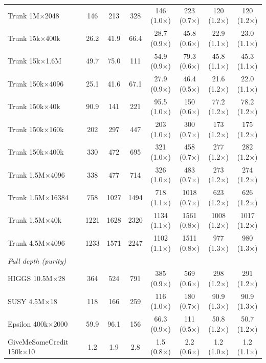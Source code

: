 \begin{table}[p]
\begin{tabular}{l|ccc|cccc}
        Trunk 1M$\times$2048 & 146 & 213 & 328 & 146 (1.0$\times$) & 223 (0.7$\times$) & 120 (1.2$\times$) & 120 (1.2$\times$) \\
        Trunk 15k$\times$400k & 26.2 & 41.9 & 66.4 & 28.7 (0.9$\times$) & 45.8 (0.6$\times$) & 22.9 (1.1$\times$) & 23.0 (1.1$\times$) \\
        Trunk 15k$\times$1.6M & 49.7 & 75.0 & 111 & 54.9 (0.9$\times$) & 79.3 (0.6$\times$) & 45.8 (1.1$\times$) & 45.3 (1.1$\times$) \\
        Trunk 150k$\times$4096 & 25.1 & 41.6 & 67.1 & 27.9 (0.9$\times$) & 46.4 (0.5$\times$) & 21.6 (1.2$\times$) & 22.0 (1.1$\times$) \\
        Trunk 150k$\times$40k & 90.9 & 141 & 221 & 95.5 (1.0$\times$) & 150 (0.6$\times$) & 77.2 (1.2$\times$) & 78.2 (1.2$\times$) \\
        Trunk 150k$\times$160k & 202 & 297 & 447 & 203 (1.0$\times$) & 300 (0.7$\times$) & 173 (1.2$\times$) & 175 (1.2$\times$) \\
        Trunk 150k$\times$400k & 330 & 472 & 695 & 321 (1.0$\times$) & 458 (0.7$\times$) & 277 (1.2$\times$) & 282 (1.2$\times$) \\
        Trunk 1.5M$\times$4096 & 338 & 477 & 714 & 326 (1.0$\times$) & 483 (0.7$\times$) & 273 (1.2$\times$) & 274 (1.2$\times$) \\
        Trunk 1.5M$\times$16384 & 758 & 1027 & 1494 & 718 (1.1$\times$) & 1018 (0.7$\times$) & 623 (1.2$\times$) & 626 (1.2$\times$) \\
        Trunk 1.5M$\times$40k & 1221 & 1628 & 2320 & 1134 (1.1$\times$) & 1561 (0.8$\times$) & 1008 (1.2$\times$) & 1017 (1.2$\times$) \\
        Trunk 4.5M$\times$4096 & 1233 & 1571 & 2247 & 1102 (1.1$\times$) & 1511 (0.8$\times$) & 977 (1.3$\times$) & 980 (1.3$\times$) \\
        \hline
        \multicolumn{8}{l}{\textit{Full depth (purity)}} \\
        HIGGS 10.5M$\times$28 & 364 & 524 & 791 & 385 (0.9$\times$) & 569 (0.6$\times$) & 298 (1.2$\times$) & 291 (1.2$\times$) \\
        SUSY 4.5M$\times$18 & 118 & 166 & 259 & 116 (1.0$\times$) & 180 (0.7$\times$) & 90.9 (1.3$\times$) & 90.9 (1.3$\times$) \\
        Epsilon 400k$\times$2000 & 59.9 & 96.1 & 156 & 66.3 (0.9$\times$) & 111 (0.5$\times$) & 50.8 (1.2$\times$) & 50.7 (1.2$\times$) \\
        GiveMeSomeCredit 150k$\times$10 & 1.2 & 1.9 & 2.8 & 1.5 (0.8$\times$) & 2.2 (0.6$\times$) & 1.2 (1.0$\times$) & 1.2 (1.1$\times$) \\

\end{tabular}
\end{table}
